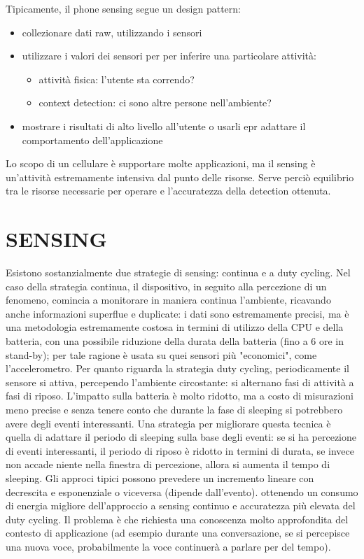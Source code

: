 Tipicamente, il phone sensing segue un design pattern:
\begin{itemize}
\item collezionare dati raw, utilizzando i sensori
\item utilizzare i valori dei sensori per per inferire una particolare
attività:
\begin{itemize}
\item attività fisica: l'utente sta correndo?
\item context detection: ci sono altre persone nell'ambiente?
\end{itemize}
\item mostrare i risultati di alto livello all'utente o usarli epr adattare il
comportamento dell'applicazione
\end{itemize}

Lo scopo di un cellulare è supportare molte applicazioni, ma il sensing è
un'attività estremamente intensiva dal punto delle risorse. Serve perciò
equilibrio tra le risorse necessarie per operare e l'accuratezza della detection
ottenuta.

\section{SENSING}
Esistono sostanzialmente due strategie di sensing: continua e a duty cycling.
Nel caso della strategia continua, il dispositivo, in seguito alla percezione di
un fenomeno, comincia a monitorare in maniera continua l'ambiente, ricavando
anche informazioni superflue e duplicate: i dati sono estremamente precisi, ma è
una metodologia estremamente costosa in termini di utilizzo della CPU e della
batteria, con una possibile riduzione della durata della batteria (fino a 6 ore
in stand-by); per tale ragione è usata su quei sensori più "economici", come
l'accelerometro.
Per quanto riguarda la strategia duty cycling, periodicamente il sensore si
attiva, percependo l'ambiente circostante: si alternano fasi di attività a fasi
di riposo. L'impatto sulla batteria è molto ridotto, ma a costo di misurazioni
meno precise e senza tenere conto che durante la fase di sleeping si potrebbero
avere degli eventi interessanti.
Una strategia per migliorare questa tecnica è quella di adattare il periodo di
sleeping sulla base degli eventi: se si ha percezione di eventi interessanti, il
periodo di riposo è ridotto in termini di durata, se invece non accade niente
nella finestra di percezione, allora si aumenta il tempo di sleeping.
Gli approci tipici possono prevedere un incremento lineare con decrescita e
esponenziale o viceversa (dipende dall'evento). ottenendo un consumo di energia
migliore dell'approccio a sensing continuo e accuratezza più elevata del duty
cycling.
Il problema è che richiesta una conoscenza molto approfondita del contesto di
applicazione (ad esempio durante una conversazione, se si percepisce una nuova
voce, probabilmente la voce continuerà a parlare per del tempo).

